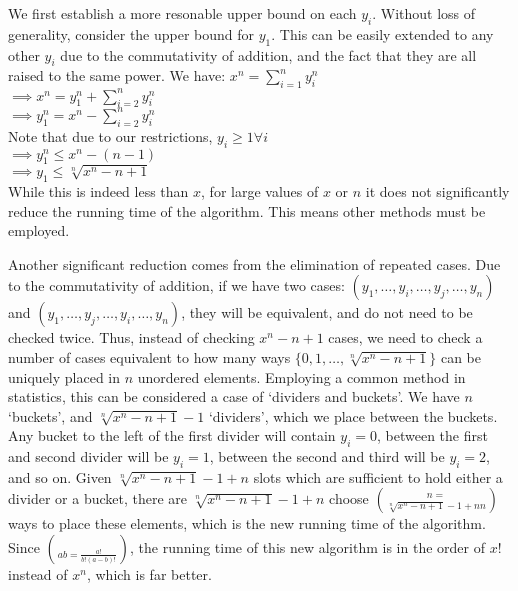 \documentclass{article}
\begin{document}
\begin{flushleft}
We first establish a more resonable upper bound on each $y_i$. Without loss of generality, consider the upper bound for $y_1$. This can be easily extended to any other $y_i$ due to the commutativity of addition, and the fact that they are all raised to the same power. We have: $x^n = \sum^{n}_{i=1}y_i^n$ \\
\hspace{.2in} $\implies x^n = y_1^n + \sum_{i = 2}^ny_i^n$ \\
\hspace{.2in} $\implies y_1^n = x^n - \sum_{i = 2}^ny_i^n$ \\
Note that due to our restrictions, $y_i \geq 1 \forall i$ \\
\hspace{.2in} $\implies y_1^n \leq x^n - (n - 1)$ \\
\hspace{.2in} $\implies y_1 \leq \sqrt[n]{x^n - n + 1}$ \\
While this is indeed less than $x$, for large values of $x$ or $n$ it does not significantly reduce the running time of the algorithm. This means other methods must be employed.

\vspace{.1in}

Another significant reduction comes from the elimination of repeated cases. Due to the commutativity of addition, if we have two cases: $(y_1, \ldots, y_i, \ldots, y_j, \ldots, y_n)$ and $(y_1, \ldots, y_j, \ldots, y_i, \ldots, y_n)$, they will be equivalent, and do not need to be checked twice. Thus, instead of checking $x^n - n + 1$ cases, we need to check a number of cases equivalent to how many ways $\{0, 1, \ldots, \sqrt[n]{x^n - n + 1}\}$ can be uniquely placed in $n$ unordered elements. Employing a common method in statistics, this can be considered a case of `dividers and buckets'. We have $n$ `buckets', and $\sqrt[n]{x^n - n + 1} - 1$ `dividers', which we place between the buckets. Any bucket to the left of the first divider will contain $y_i = 0$, between the first and second divider will be $y_i = 1$, between the second and third will be $y_i = 2$, and so on. Given $\sqrt[n]{x^n - n + 1} - 1 + n$ slots which are sufficient to hold either a divider or a bucket, there are $\sqrt[n]{x^n - n + 1} - 1 + n$ choose $n = \choose{\sqrt[n]{x^n - n + 1} - 1 + n}{n}$ ways to place these elements, which is the new running time of the algorithm. Since $\choose{a}{b} = \frac{a!}{b!(a - b)!}$, the running time of this new algorithm is in the order of $x!$ instead of $x^n$, which is far better.


\end{flushleft}
\end{document}
